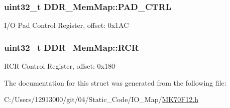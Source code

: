 \subsubsection[{P\+A\+D\+\_\+\+C\+T\+R\+L}]{\setlength{\rightskip}{0pt plus 5cm}uint32\+\_\+t D\+D\+R\+\_\+\+Mem\+Map\+::\+P\+A\+D\+\_\+\+C\+T\+R\+L}\label{struct_d_d_r___mem_map_abeb11d4cc28f5bb277d0cd4a46cb2ce1}
I/\+O Pad Control Register, offset\+: 0x1\+A\+C \hypertarget{struct_d_d_r___mem_map_a46f3bdf0cbb782701ad3edd860cfb667}{}
\subsubsection[{R\+C\+R}]{\setlength{\rightskip}{0pt plus 5cm}uint32\+\_\+t D\+D\+R\+\_\+\+Mem\+Map\+::\+R\+C\+R}\label{struct_d_d_r___mem_map_a46f3bdf0cbb782701ad3edd860cfb667}
R\+C\+R Control Register, offset\+: 0x180 

The documentation for this struct was generated from the following file\+:\begin{DoxyCompactItemize}
\item 
C\+:/\+Users/12913000/git/04/\+Static\+\_\+\+Code/\+I\+O\+\_\+\+Map/\hyperlink{_m_k70_f12_8h}{M\+K70\+F12.\+h}\end{DoxyCompactItemize}
